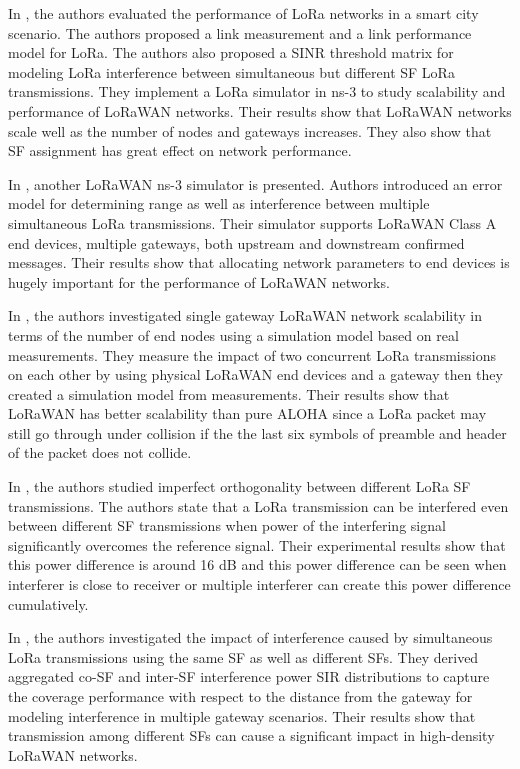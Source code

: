 \documentclass[conference]{IEEEtran}
\begin{document}
\par In \cite{7996384}, the authors evaluated the performance of LoRa networks in a smart city scenario. The
authors proposed a link measurement and a link performance model for LoRa. The authors also proposed a SINR threshold matrix for modeling LoRa interference between simultaneous but different SF LoRa transmissions. They implement a LoRa simulator in ns-3 to study scalability and performance of LoRaWAN networks. Their results show that LoRaWAN networks scale well as the number of nodes and gateways increases. They also show that SF assignment has great effect on network performance.

\par In \cite{8090518}, another LoRaWAN ns-3 simulator is presented. Authors introduced an error model for determining range as well as interference between multiple simultaneous LoRa transmissions. Their simulator supports LoRaWAN Class A end devices, multiple gateways, both upstream and downstream confirmed messages. Their results show that allocating network parameters to end devices is hugely important for the performance of LoRaWAN networks.

\par In \cite{s17061193}, the authors investigated single gateway LoRaWAN network scalability in terms of the number of end nodes using a simulation model based on real measurements. They measure the impact of two concurrent LoRa transmissions on each other by using physical LoRaWAN end devices and a gateway then they created a simulation model from measurements. Their results show that LoRaWAN has better scalability than pure ALOHA since a LoRa packet may still go through under collision if the the last six symbols of preamble and header of the packet does not collide.

\par In \cite{8267219}, the authors studied imperfect orthogonality between different LoRa SF transmissions. The authors state that a LoRa transmission can be interfered even between different SF transmissions when power of the interfering signal significantly overcomes the reference signal. Their experimental results show that this power difference is around 16 dB and this power difference can be seen when  interferer is close to receiver or multiple interferer can create this power difference cumulatively. 

\par In \cite{8430542}, the authors investigated the impact of interference caused by simultaneous LoRa transmissions using the same SF as well as different SFs. They derived aggregated co-SF and inter-SF interference power SIR distributions to capture the coverage performance with respect to the distance from the gateway for modeling interference in multiple gateway scenarios. Their results show that transmission among different SFs can cause a significant impact in high-density LoRaWAN networks.
\end{document}
